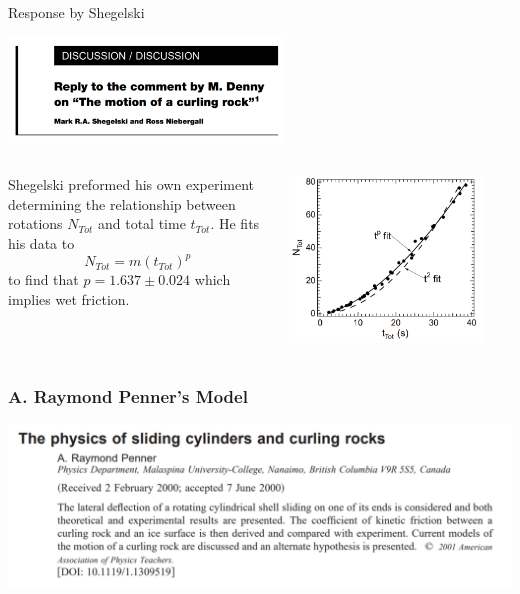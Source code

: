 \documentclass{beamer}
\begin{document}
\begin{frame}{Response by Shegelski}
    \begin{center}
        \includegraphics[width=0.55\textwidth]{Images/Denny_Comment_Reply.png}
    \end{center}
    \begin{columns}
        \begin{column}{0.4\textwidth}
            Shegelski preformed his own experiment determining the relationship between rotations $N_{Tot}$ and total time $t_{Tot}$. He fits his data to 
            $$N_{Tot} = m(t_{Tot})^{p}$$
            to find that $p=1.637\pm0.024$ which implies wet friction.
        \end{column}
        \begin{column}{0.59\textwidth}
            \begin{center}
                \includegraphics[width=0.88\textwidth]{Images/Denny_Comment_Reply_Plot.png}
            \end{center}
        \end{column}
    \end{columns}
\end{frame}
    
\begin{frame}\frametitle{A. Raymond Penner's Model}
    \begin{center}
    \includegraphics[width=1.0\textwidth]{Images/A_Penner_2000.png}
    \end{center}
\end{frame}
\end{document}
